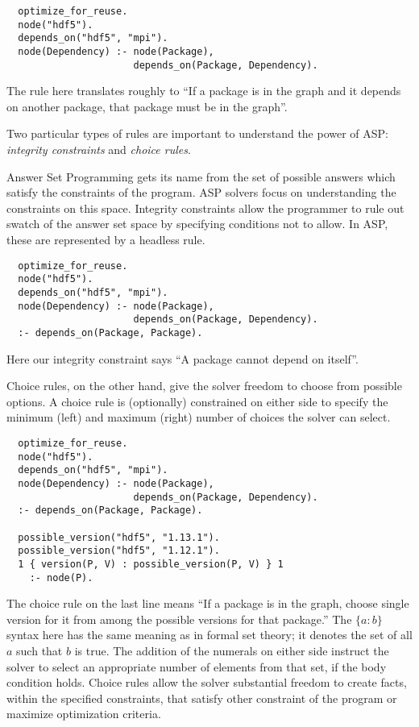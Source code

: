 \begin{verbatim}
  optimize_for_reuse.
  node("hdf5").
  depends_on("hdf5", "mpi").
  node(Dependency) :- node(Package),
                      depends_on(Package, Dependency).
\end{verbatim}

The rule here translates roughly to ``If a package is in the graph and it depends on another package, that package must be in the graph''.

Two particular types of rules are important to understand the power of ASP: \textit{integrity constraints} and \textit{choice rules}.

Answer Set Programming gets its name from the set of possible answers which satisfy the constraints of the program.
ASP solvers focus on understanding the constraints on this space.
Integrity constraints allow the programmer to rule out swatch of the answer set space by specifying conditions not to allow.
In ASP, these are represented by a headless rule.

\begin{verbatim}
  optimize_for_reuse.
  node("hdf5").
  depends_on("hdf5", "mpi").
  node(Dependency) :- node(Package),
                      depends_on(Package, Dependency).
  :- depends_on(Package, Package).
\end{verbatim}

Here our integrity constraint says ``A package cannot depend on itself''.

Choice rules, on the other hand, give the solver freedom to choose from possible options.
A choice rule is (optionally) constrained on either side to specify the minimum (left) and maximum (right) number of choices the solver can select.

\begin{verbatim}
  optimize_for_reuse.
  node("hdf5").
  depends_on("hdf5", "mpi").
  node(Dependency) :- node(Package),
                      depends_on(Package, Dependency).
  :- depends_on(Package, Package).

  possible_version("hdf5", "1.13.1").
  possible_version("hdf5", "1.12.1").
  1 { version(P, V) : possible_version(P, V) } 1
    :- node(P).
\end{verbatim}

The choice rule on the last line means ``If a package is in the graph, choose single version for it from among the possible versions for that package.''
The $\{a:b\}$ syntax here has the same meaning as in formal set theory; it denotes the set of all $a$ such that $b$ is true.
The addition of the numerals on either side instruct the solver to select an appropriate number of elements from that set, if the body condition holds.
Choice rules allow the solver substantial freedom to create facts, within the specified constraints, that satisfy other constraint of the program or maximize optimization criteria.

